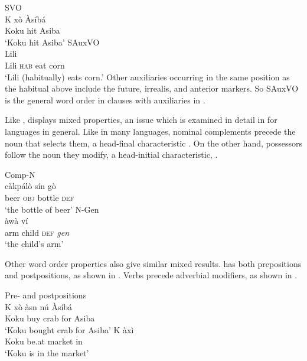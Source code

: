 \documentclass[output=paper]{LSP/langsci}
\begin{document}
\ea \label{ex:Fongbe-SVO}  
{SVO}\\
\ea 
\gll K x\`o \`As\'ib\'a \\
Koku hit Asiba \\
\glt `Koku hit Asiba' \hfill \citep[][247]{lefebvre2002}
\ex \label{ex:Fongbe-SAuxVO}
 {SAuxVO}\\
\gll Lili     \\
Lili \textsc{hab} eat corn \\
\glt `Lili (habitually) eats corn.' \hfill \citep[][94]{lefebvre2002}
\z
\z 
Other auxiliaries occurring in the same position as the habitual above include the future, irrealis, and anterior markers. So SAuxVO is the general word order in clauses with auxiliaries in .

Like ,  displays mixed  properties, an issue which is examined in detail in \citet{aboh04} for  languages in general. Like in many  languages,  nominal complements precede the noun that selects them, a head-final characteristic . On the other hand, possessors follow the noun they modify, a head-initial characteristic, .

\ea
\ea  \label{ex:Fongbe-CompN} {Comp-N}\\
\gll c\`akp\'al\`o s\'in g\`o  \\
beer \textsc{obj} bottle \textsc{def} \\
\glt `the bottle of beer' \hfill \citep[][45]{lefebvre2002}
\ex \label{ex:Fongbe-NGen} {N-Gen}\\
\gll \`aw\`a v\'i   \\
arm child \textsc{def} \textit{gen} \\
\glt `the child's arm' \hfill \citep[][45]{lefebvre2002}
\z
\z 

Other word order properties also give similar mixed results.  has both prepositions and postpositions, as shown in . Verbs precede adverbial modifiers, as shown in . 

\ea
\ea \label{ex:Fongbe-PP} {Pre- and postpositions}\\
 \gll K x\`o \`asn n\'u  \`As\'ib\'a \\
Koku buy crab for Asiba \\
\glt `Koku bought crab for Asiba' \hfill \citep[][302]{lefebvre2002}
\ex \gll K  \`ax\`i  \\
Koku be.at market in \\
\glt `Koku is in the market' \hfill \citep[][325]{lefebvre2002}
\z
\z
\end{document}
